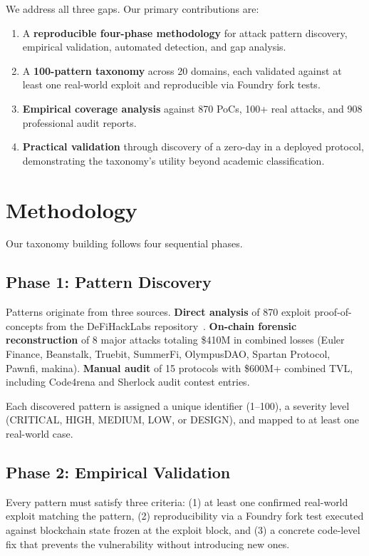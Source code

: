 \documentclass[runningheads]{llncs}
\begin{document}
We address all three gaps. Our primary contributions are:

\begin{enumerate}
\item A \textbf{reproducible four-phase methodology} for attack pattern discovery, empirical validation, automated detection, and gap analysis.
\item A \textbf{100-pattern taxonomy} across 20 domains, each validated against at least one real-world exploit and reproducible via Foundry fork tests.
\item \textbf{Empirical coverage analysis} against 870 PoCs, 100+ real attacks, and 908 professional audit reports.
\item \textbf{Practical validation} through discovery of a zero-day in a deployed protocol, demonstrating the taxonomy's utility beyond academic classification.
\end{enumerate}

\section{Methodology}

Our taxonomy building follows four sequential phases.

\subsection{Phase 1: Pattern Discovery}

Patterns originate from three sources. \textbf{Direct analysis} of 870 exploit proof-of-concepts from the DeFiHackLabs repository~\cite{defihacklabs}. \textbf{On-chain forensic reconstruction} of 8 major attacks totaling \$410M in combined losses (Euler Finance, Beanstalk, Truebit, SummerFi, OlympusDAO, Spartan Protocol, Pawnfi, makina). \textbf{Manual audit} of 15 protocols with \$600M+ combined TVL, including Code4rena and Sherlock audit contest entries.

Each discovered pattern is assigned a unique identifier (1--100), a severity level (CRITICAL, HIGH, MEDIUM, LOW, or DESIGN), and mapped to at least one real-world case.

\subsection{Phase 2: Empirical Validation}

Every pattern must satisfy three criteria: (1) at least one confirmed real-world exploit matching the pattern, (2) reproducibility via a Foundry fork test executed against blockchain state frozen at the exploit block, and (3) a concrete code-level fix that prevents the vulnerability without introducing new ones.
\end{document}

